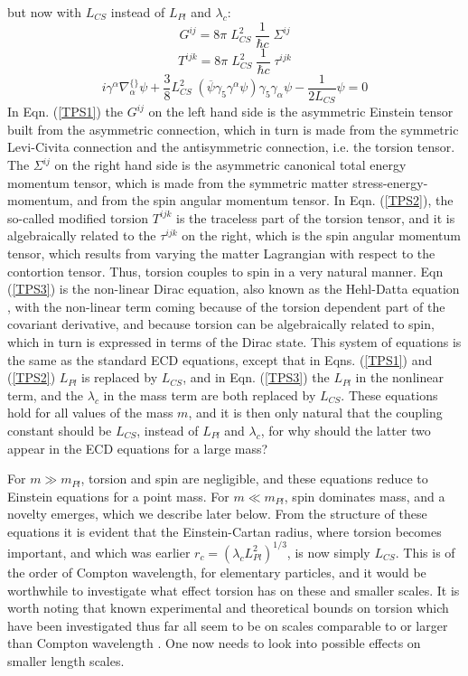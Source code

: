 \documentclass[prd, preprint, 12pt]{revtex4-1}
\begin{document}
but now with $L_{CS}$ instead of $L_{Pl}$ and $\lambda_c$:
\begin{equation}
G^{ij} = 8\pi \; L_{CS}^2 \;  \frac{1}{\hbar c}\; \Sigma^{ij}
\label{TPS1}
\end{equation}
\begin{equation}
T^{ijk} =8\pi \;  L_{CS}^2 \;  \frac{1}{\hbar c} \; \tau^{ijk}
 \label{TPS2}
 \end{equation}
 \begin{equation}
 i\gamma^{\alpha} \nabla^{\{\}}_{\alpha}\psi + \frac{3}{8} L_{CS}^2 \; (\overline{\psi}\gamma_5 \gamma^{\alpha}\psi) \gamma_5 \gamma_{\alpha}\psi - \frac{1}{2 L_{CS}} \psi =0
 \label{TPS3}
 \end{equation}
 In Eqn. (\ref{TPS1}) the $G^{ij}$ on the left hand side is the asymmetric Einstein tensor built from the asymmetric connection, which in turn is made from the symmetric Levi-Civita connection and the antisymmetric connection, i.e. the torsion tensor. The $\Sigma^{ij}$ on the right hand side is the asymmetric canonical total energy momentum tensor, which is made from the symmetric matter stress-energy-momentum, and from the spin angular momentum tensor. In Eqn. (\ref{TPS2}), the so-called 
 modified torsion $T^{ijk}$ is the traceless part of the torsion tensor, and it is algebraically related to the $\tau^{ijk}$ on the right, which is the spin angular momentum tensor, which results from varying the matter Lagrangian with respect to the contortion tensor. Thus, torsion couples to spin in a very natural manner. Eqn (\ref{TPS3}) is the non-linear Dirac equation, also known as the Hehl-Datta equation \cite{HD}, with the non-linear term coming because of the torsion dependent part of the covariant derivative, and because torsion can be algebraically related to spin, which in turn is expressed in terms of the Dirac state. This system of equations is the same as the standard ECD equations, except that in Eqns. (\ref{TPS1}) and (\ref{TPS2}) $L_{Pl}$ is replaced by $L_{CS}$, and in Eqn. (\ref{TPS3}) the $L_{Pl}$ in the nonlinear term, and  the $\lambda_c$ in the mass term are both replaced by $L_{CS}$. These equations hold for all values of the mass $m$, and it  is then only natural that the coupling constant should be $L_{CS}$, instead of $L_{Pl}$ and $\lambda_c$, for why should the latter two appear in the ECD equations for a large mass? 
 
 For $m\gg m_{Pl}$, torsion and spin are negligible, and these equations reduce to Einstein equations for a point mass. For $m\ll m_{Pl}$, spin dominates mass, and a novelty emerges, which we describe later below. From the structure of these equations it is evident that the Einstein-Cartan radius, where torsion becomes important, and which was earlier $r_c = (\lambda_c L_{Pl}^2)^{1/3}$, is now simply $L_{CS}$. This is of the order of Compton wavelength, for elementary particles, and it would be worthwhile to investigate what effect torsion has on these and smaller scales. It is worth noting that known experimental and theoretical bounds on torsion which have been investigated thus far all seem to be on scales comparable to or larger than Compton wavelength \cite{Shapiro}. One now needs to look into possible effects on smaller length scales. 
 
\end{document}
